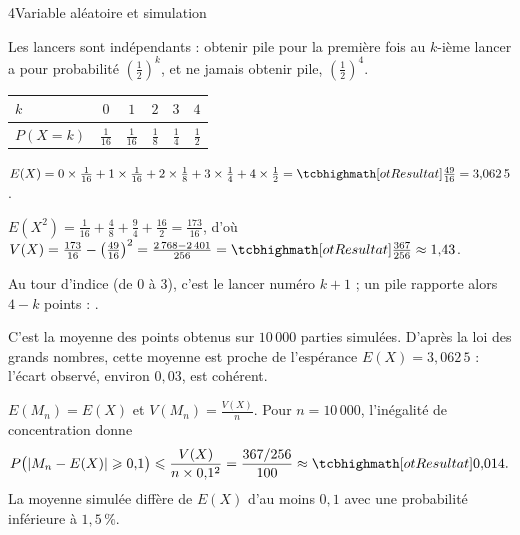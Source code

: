 

\begin{corrigeBac}{4}{Variable aléatoire et simulation}
\begin{questions}
  \item Les lancers sont indépendants : obtenir pile pour la première fois au $k$-ième lancer a pour probabilité
    $\left(\frac12\right)^{k}$, et ne jamais obtenir pile, $\left(\frac12\right)^{4}$.
\begin{center}
{\renewcommand{\arraystretch}{1.35}%
\begin{tabular}{@{}lccccc@{}}
\toprule
$k$ & $0$ & $1$ & $2$ & $3$ & $4$ \\
\midrule
$P(X=k)$ & $\frac1{16}$ & $\frac1{16}$ & $\frac18$ & $\frac14$ & $\frac12$ \\
\bottomrule
\end{tabular}}
\end{center}
    \pts{1 pt}
  \item $E(X)=0\times\frac1{16}+1\times\frac1{16}+2\times\frac18+3\times\frac14+4\times\frac12=\res{\tfrac{49}{16}}=3{,}062\,5$. 
  \item $E(X^{2})=\frac1{16}+\frac48+\frac94+\frac{16}{2}=\frac{173}{16}$, d'où
    $V(X)=\frac{173}{16}-\left(\frac{49}{16}\right)^{2}=\frac{2\,768-2\,401}{256}=\res{\tfrac{367}{256}}\approx1{,}43$. 
\end{questions}
\begin{questions}[resume]
  \item Au tour d'indice  (de $0$ à $3$), c'est le lancer numéro $k+1$ ; un pile rapporte alors $4-k$ points : . 
  \item C'est la moyenne des points obtenus sur $10\,000$ parties simulées. D'après la loi des grands nombres, cette moyenne est proche
    de l'espérance $E(X)=3{,}062\,5$ : l'écart observé, environ $0{,}03$, est cohérent. 
  \item $E(M_n)=E(X)$ et $V(M_n)=\frac{V(X)}{n}$. Pour $n=10\,000$, l'inégalité de concentration donne
    \[P\big(|M_n-E(X)|\geq0{,}1\big)\leq\frac{V(X)}{n\times0{,}1^{2}}=\frac{367/256}{100}\approx\res{0{,}014}.\]
    La moyenne simulée diffère de $E(X)$ d'au moins $0{,}1$ avec une probabilité inférieure à $1{,}5\,\%$. \pts{1 pt}
\end{questions}
\end{corrigeBac}

